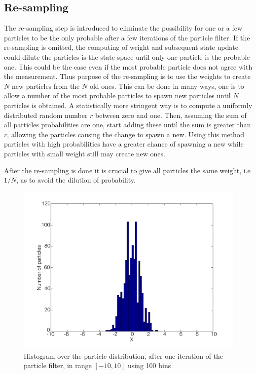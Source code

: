 \documentclass{LTHthesis}
\begin{document}
\subsection{Re-sampling}
%
The re-sampling step is introduced to eliminate the possibility for one or a few particles to be the only probable after a few iterations of the particle filter. If the re-sampling is omitted, the computing of weight and subsequent state update could dilute the particles is the state-space until only one particle is the probable one. This could be the case even if the most probable particle does not agree with the measurement. Thus purpose of the re-sampling is to use the weights to create $N$ new particles from the $N$ old ones. This can be done in many ways, one is to allow a number of the most probable particles to spawn new particles until $N$ particles is obtained. A statistically more stringent way is to compute a uniformly distributed random number $r$ between zero and one. Then, assuming the sum of all particles probabilities are one, start adding these until the sum is greater than $r$, allowing the particles causing the change to spawn a new. Using this method particles with high probabilities have a greater chance of spawning a new while particles with small weight still may create new ones.

After the re-sampling is done it is crucial to give all particles the same weight, i.e $1/N$, as to avoid the dilution of probability.
%
\begin{figure}[!hbt]

\includegraphics[width=1\textwidth ]{images/PF/hist_dist_1_itr}
\caption{Histogram over the particle distribution, after one iteration of the particle filter, in range $[-10,10]$ using 100 bins}\label{hist_dist_1_itr}
\end{figure}
\end{document}
